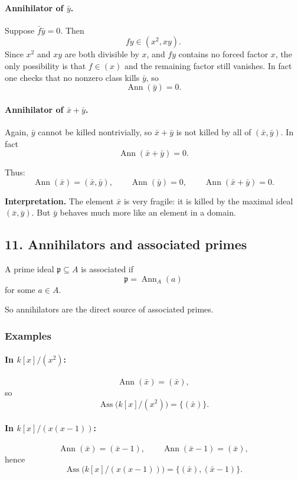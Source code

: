 \documentclass[12pt,a4paper,oneside]{report}
\DeclareMathOperator{\Ass}{Ass}
\DeclareMathOperator{\Ann}{Ann}
\theoremstyle{notespace}
\begin{document}
	\paragraph{Annihilator of \(\bar y\).}
	Suppose \(\bar f\bar y=0\). Then
	\[
	fy\in (x^2,xy).
	\]
	Since \(x^2\) and \(xy\) are both divisible by \(x\), and \(fy\) contains no forced factor \(x\), the only possibility is that \(f\in (x)\) and the remaining factor still vanishes. In fact one checks that no nonzero class kills \(\bar y\), so
	\[
	\Ann(\bar y)=0.
	\]
	
	\paragraph{Annihilator of \(\bar x+\bar y\).}
	Again, \(\bar y\) cannot be killed nontrivially, so \(\bar x+\bar y\) is not killed by all of \((\bar x,\bar y)\). In fact
	\[
	\Ann(\bar x+\bar y)=0.
	\]
	
	Thus:
	\[
	\Ann(\bar x)=(\bar x,\bar y),\qquad
	\Ann(\bar y)=0,\qquad
	\Ann(\bar x+\bar y)=0.
	\]
	
	\medskip
	
	\noindent
	\textbf{Interpretation.}
	The element \(\bar x\) is very fragile: it is killed by the maximal ideal \((\bar x,\bar y)\). But \(\bar y\) behaves much more like an element in a domain.
	
	\subsection{11. Annihilators and associated primes}
	
	A prime ideal \(\mathfrak p\subseteq A\) is associated if
	\[
	\mathfrak p=\Ann_A(a)
	\]
	for some \(a\in A\).
	
	So annihilators are the direct source of associated primes.
	
	\subsubsection{Examples}
	
	\paragraph{In \(k[x]/(x^2)\):}
	\[
	\Ann(\bar x)=(\bar x),
	\]
	so
	\[
	\Ass\bigl(k[x]/(x^2)\bigr)=\{(\bar x)\}.
	\]
	
	\paragraph{In \(k[x]/(x(x-1))\):}
	\[
	\Ann(\bar x)=(\bar x-1),\qquad \Ann(\bar x-1)=(\bar x),
	\]
	hence
	\[
	\Ass\bigl(k[x]/(x(x-1))\bigr)=\{(\bar x),(\bar x-1)\}.
	\]
	
\end{document}
